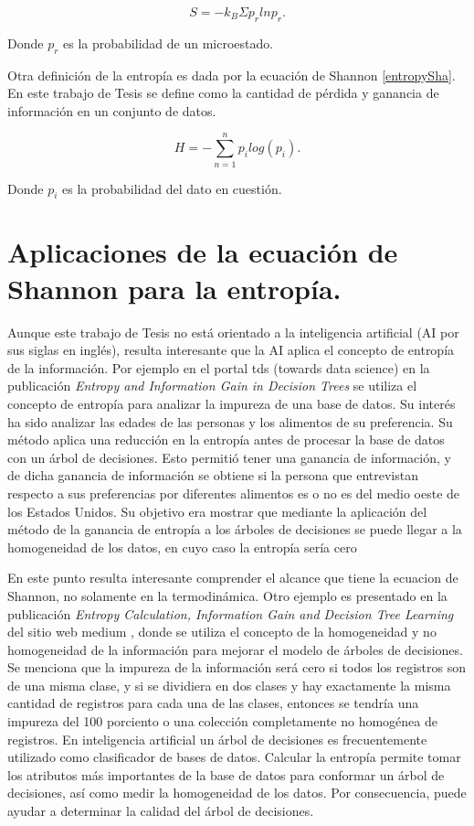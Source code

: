  \begin{equation}
 	S = -k_B \Sigma p_r ln p_r.
 \end{equation}  

Donde $p_r$ es la probabilidad de un microestado. 

Otra definición de la entropía es dada por la ecuación de Shannon \ref{entropySha}.
En este trabajo de Tesis se define como la cantidad de pérdida y ganancia de información en un conjunto de datos.

\begin{equation}
	H = - \sum_{n=1}^{n} p_i log(p_i).
	\label{entropySha}
\end{equation}

Donde $p_i$ es la probabilidad del dato en cuestión. 

\section{Aplicaciones de la ecuación de Shannon para la entropía.}

Aunque este trabajo de Tesis no está orientado a la inteligencia artificial (AI por sus siglas en inglés), resulta interesante que la AI aplica el concepto de entropía de la información. 
Por ejemplo en el portal tds (towards data science) \citep[][]{tds} en la publicación \textit{Entropy and Information Gain in Decision Trees} se utiliza el concepto de entropía para analizar la impureza de una base de datos. 
Su interés ha sido analizar las edades de las personas y los alimentos de su preferencia. 
Su método aplica una reducción en la entropía antes de procesar la base de datos con un árbol de decisiones. 
Esto permitió tener una ganancia de información\citep[][]{tds}, y de dicha ganancia de información se obtiene si la persona que entrevistan respecto a sus preferencias por diferentes alimentos es o no es del medio oeste de los Estados Unidos. Su objetivo era mostrar que mediante la aplicación del método de la ganancia de entropía a los árboles de decisiones se puede llegar a la homogeneidad de los datos, en cuyo caso la entropía sería cero

En este punto resulta interesante comprender el alcance que tiene la ecuacion de Shannon, no solamente en la termodinámica. 
Otro ejemplo es presentado en la publicación \textit{Entropy Calculation, Information Gain and Decision Tree Learning} del sitio web medium \citep[][]{medium} , donde se utiliza el concepto de la homogeneidad y no homogeneidad de la información para mejorar el modelo de árboles de decisiones. Se 
menciona que la impureza de la información será cero si todos los registros son de una misma clase, y si se dividiera en dos clases y hay exactamente la misma cantidad de registros para cada una de las clases, entonces se tendría una impureza del 100 porciento o una colección completamente no homogénea de registros. 
En inteligencia artificial un árbol de decisiones es frecuentemente utilizado como clasificador de bases de datos.
Calcular la entropía permite tomar los atributos más importantes de la base de datos para conformar un árbol de decisiones, así como medir la homogeneidad de los datos. 
Por consecuencia, puede ayudar a determinar la calidad del árbol de decisiones. 

